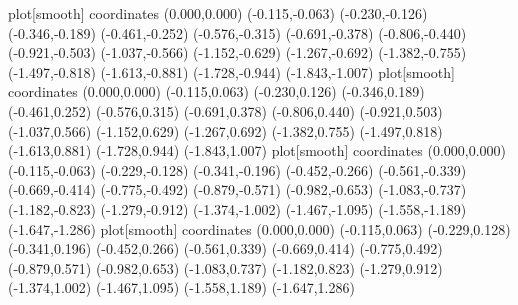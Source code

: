 plot[smooth] coordinates {(0.000,0.000) (-0.115,-0.063) (-0.230,-0.126) (-0.346,-0.189) (-0.461,-0.252) (-0.576,-0.315) (-0.691,-0.378) (-0.806,-0.440) (-0.921,-0.503) (-1.037,-0.566) (-1.152,-0.629) (-1.267,-0.692) (-1.382,-0.755) (-1.497,-0.818) (-1.613,-0.881) (-1.728,-0.944) (-1.843,-1.007)}
plot[smooth] coordinates {(0.000,0.000) (-0.115,0.063) (-0.230,0.126) (-0.346,0.189) (-0.461,0.252) (-0.576,0.315) (-0.691,0.378) (-0.806,0.440) (-0.921,0.503) (-1.037,0.566) (-1.152,0.629) (-1.267,0.692) (-1.382,0.755) (-1.497,0.818) (-1.613,0.881) (-1.728,0.944) (-1.843,1.007)}
plot[smooth] coordinates {(0.000,0.000) (-0.115,-0.063) (-0.229,-0.128) (-0.341,-0.196) (-0.452,-0.266) (-0.561,-0.339) (-0.669,-0.414) (-0.775,-0.492) (-0.879,-0.571) (-0.982,-0.653) (-1.083,-0.737) (-1.182,-0.823) (-1.279,-0.912) (-1.374,-1.002) (-1.467,-1.095) (-1.558,-1.189) (-1.647,-1.286)}
plot[smooth] coordinates {(0.000,0.000) (-0.115,0.063) (-0.229,0.128) (-0.341,0.196) (-0.452,0.266) (-0.561,0.339) (-0.669,0.414) (-0.775,0.492) (-0.879,0.571) (-0.982,0.653) (-1.083,0.737) (-1.182,0.823) (-1.279,0.912) (-1.374,1.002) (-1.467,1.095) (-1.558,1.189) (-1.647,1.286)}
